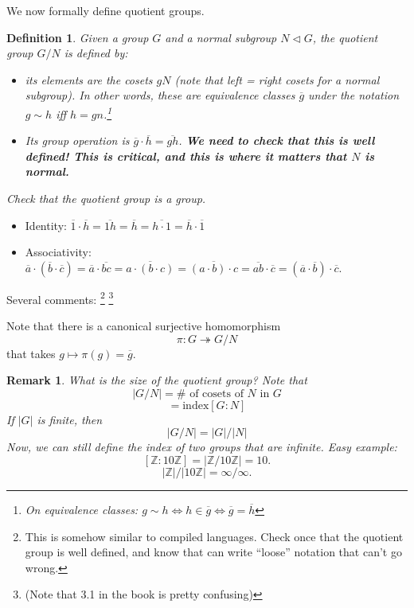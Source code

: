 \documentclass[12pt]{article}
\newtheorem*{definition}{Definition}
\newtheorem*{remark}{Remark}
\newcommand{\ol}{\overline}
\def\ZZ{\mathbb{Z}}
\begin{document}
We now formally define quotient groups. \\

\begin{definition}
  Given a group $G$ and a normal subgroup $N \triangleleft G$, the quotient group $G / N$ is defined by:
  \begin{itemize}
    \item its elements are the cosets $gN$ (note that left = right cosets for a normal subgroup).  In other words, these are equivalence classes $\overline{g}$ under the notation $g \sim h$ iff $h = gn$.\footnote{On equivalence classes: $g \sim h \Leftrightarrow h \in \overline{g} \Leftrightarrow \overline{g} = \overline{h}$}
    \item Its group operation is $\overline{g} \cdot \ol{h} = \ol{gh}$.  {\bf We need to check that this is well defined!  This is critical, and this is where it matters that $N$ is normal.}
  \end{itemize}
\end{definition}

{\it Check that the quotient group is a group.}

\begin{itemize}
  \item Identity: $\ol{1} \cdot \ol{h} = \ol{1h} = \ol{h} = \ol{h \cdot 1} = \ol{h} \cdot \ol{1}$
  \item Associativity: $\ol{a} \cdot (\ol{b} \cdot \ol{c}) = \ol{a} \cdot \ol{bc} = \ol{a \cdot (b \cdot c)} = \ol{(a \cdot b) \cdot c} = \ol{ab} \cdot \ol{c} = (\ol{a} \cdot \ol{b}) \cdot \ol{c}$.
\end{itemize}

Several comments: \footnote{This is somehow similar to compiled languages.  Check once that the quotient group is well defined, and know that can write ``loose'' notation that can't go wrong.} \footnote{(Note that 3.1 in the book is pretty confusing)}

Note that there is a canonical surjective homomorphism
\[
  \pi: G \twoheadrightarrow G / N
\]
that takes $g \mapsto \pi(g) = \ol{g}$.

\begin{remark}
  What is the size of the quotient group?  Note that
  \[
    |G / N| = \text{# of cosets of $N$ in $G$}
  \]
  \[
    = \text{index} [G: N]
  \]
  If $|G|$ is finite, then
  \[
    |G / N| = |G| / |N|
  \]
  Now, we can still define the index of two groups that are infinite.  Easy example:
  \[
    [\ZZ: 10 \ZZ] = | \ZZ / 10 \ZZ | = 10.
  \]
  \[
    |\ZZ| / | 10 \ZZ | = \infty / \infty.
  \]
\end{remark}
\end{document}
